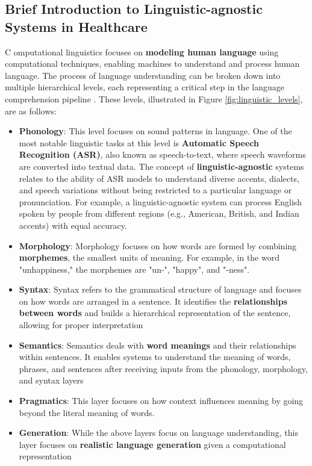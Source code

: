 \subsection{Brief Introduction to Linguistic-agnostic Systems in Healthcare}
\label{sec:linguistic_agnostic}
\lettrine{C}{ }omputational linguistics focuses on \textcolor{TUMRed}{\textbf{modeling human language}} using computational techniques, enabling machines to understand and process human language. The process of language understanding can be broken down into multiple hierarchical levels, each representing a critical step in the language comprehension pipeline \cite{cohen2022intelligent}. These levels, illustrated in Figure \ref{fig:linguistic_levels}, are as follows:
\begin{itemize}
    \item \textcolor{TUMRed}{\textbf{Phonology}}: This level focuses on sound patterns in language. One of the most notable linguistic tasks at this level is \textcolor{TUMRed}{\textbf{Automatic Speech Recognition (ASR)}}, also known as speech-to-text, where speech waveforms are converted into textual data. The concept of \textcolor{TUMRed}{\textbf{linguistic-agnostic}} systems relates to the ability of ASR models to understand diverse accents, dialects, and speech variations without being restricted to a particular language or pronunciation. For example, a linguistic-agnostic system can process English spoken by people from different regions (e.g., American, British, and Indian accents) with equal accuracy.
    \item \textcolor{TUMRed}{\textbf{Morphology}}: Morphology focuses on how words are formed by combining \textcolor{TUMRed}{\textbf{morphemes}}, the smallest units of meaning. For example, in the word "unhappiness," the morphemes are "un-", "happy", and "-ness".
    \item \textcolor{TUMRed}{\textbf{Syntax}}: Syntax refers to the grammatical structure of language and focuses on how words are arranged in a sentence. It identifies the \textcolor{TUMRed}{\textbf{relationships between words}} and builds a hierarchical representation of the sentence, allowing for proper interpretation
    \item \textcolor{TUMRed}{\textbf{Semantics}}: Semantics deals with \textcolor{TUMRed}{\textbf{word meanings}} and their relationships within sentences. It enables systems to understand the meaning of words, phrases, and sentences after receiving inputs from the phonology, morphology, and syntax layers
    \item \textcolor{TUMRed}{\textbf{Pragmatics}}: This layer focuses on how context influences meaning by going beyond the literal meaning of words. 
    \item \textcolor{TUMRed}{\textbf{Generation}}: While the above layers focus on language understanding, this layer focuses on \textcolor{TUMRed}{\textbf{realistic language generation}} given a computational representation 
\end{itemize}

